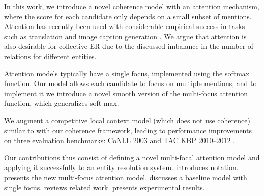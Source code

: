 


In this work, we introduce a novel coherence model with an attention mechanism, where the 
score for each candidate only depends on a small subset of mentions.
 Attention has recently been
used with considerable empirical success in tasks such as translation
\cite{bahdanau2014neural} and image caption generation
\cite{xu2015show}. We argue that attention is also desirable for
collective ER due to the discussed imbalance in the number of
relations for different entities.

Attention models typically have a single focus, implemented using the
 softmax function. Our model allows each candidate to
 focus on multiple mentions, and to implement it we introduce a 
 novel smooth version of the
 multi-focus attention function, which generalizes soft-max.

We augment a competitive local context model (which does not use
coherence) similar to \cite{Lazic2015} with our coherence
framework, leading to performance improvements on three  evaluation benchmarks:
CoNLL 2003 \cite{Hoffart2011} and TAC KBP 2010--2012 \cite{TAC2010,TAC2011,TAC2012}.

Our contributions thus consist of defining a novel multi-focal
attention model and applying it
successfully to an entity resolution system.  
 introduces notation.
 presents the new multi-focus attention
model.   discusses a baseline model with
single focus.   reviews related work.
 presents experimental results.
%


